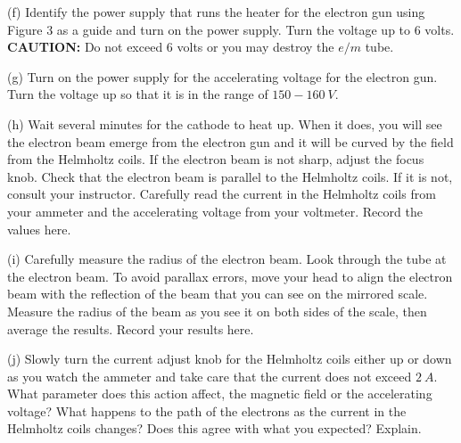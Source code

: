 (f) Identify the power supply that runs the heater for the electron gun using 
Figure 3 as a guide and turn on the power supply. Turn the voltage up to 
6 volts. {\bf CAUTION:} Do not exceed 6 volts or you may destroy the $e/m$
tube.

(g) Turn on the power supply for the accelerating voltage for the electron gun.
Turn the voltage up so that it is in the range of $150-160~V$.

(h) Wait several minutes for the cathode to heat up. When
it does, you will see the electron beam emerge from
the electron gun and it will be curved by the field from
the Helmholtz coils. If the electron beam is not sharp, adjust the focus knob. 
Check that the electron beam is
parallel to the Helmholtz coils. If it is not, consult your instructor.
 Carefully read the current in the Helmholtz coils from
your ammeter and the accelerating voltage from your
voltmeter. Record the values here.
\vspace{15mm}

(i) Carefully measure the radius of the electron beam.
Look through the tube at the electron beam. To avoid
parallax errors, move your head to align the electron
beam with the reflection of the beam that you can see
on the mirrored scale. Measure the radius of the beam as you
see it on both sides of the scale, then average the results.
Record your results here.
\vspace{20mm}

(j) Slowly turn the current adjust knob for the Helmholtz
coils either up or down as you watch the ammeter and take care that
the current does not exceed $2 ~A$.
What parameter does this action affect, the magnetic field or the
accelerating voltage?
What happens to the path of the electrons as the current in the Helmholtz
coils changes? Does this agree with what you expected? Explain.
\vspace{20mm}


